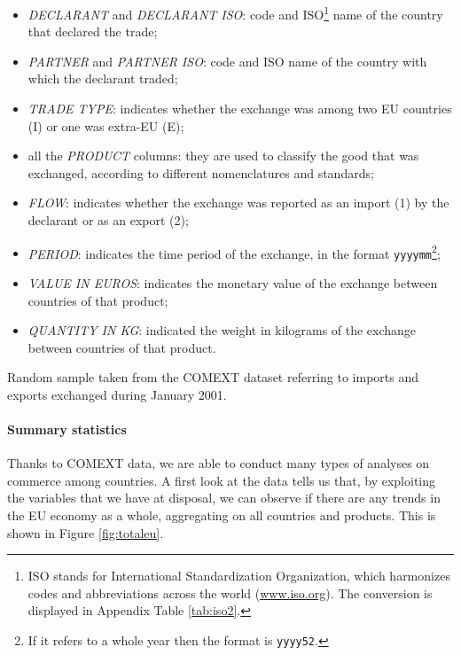 \begin{itemize}
    \item \textit{DECLARANT} and \textit{DECLARANT ISO}: code and ISO\footnote{ISO stands for International Standardization Organization, which harmonizes codes and abbreviations across the world (\url{www.iso.org}). The conversion is displayed in Appendix Table \ref{tab:iso2}.} name of the country that declared the trade;
    \item \textit{PARTNER} and \textit{PARTNER ISO}: code and ISO name of the country with which the declarant traded;
    \item \textit{TRADE TYPE}: indicates whether the exchange was among two EU countries (I) or one was extra-EU (E);
    \item all the \textit{PRODUCT} columns: they are used to classify the good that was exchanged, according to different nomenclatures and standards;
    \item \textit{FLOW}: indicates whether the exchange was reported as an import (1) by the declarant or as an export (2);
    \item \textit{PERIOD}: indicates the time period of the exchange, in the format \texttt{yyyymm}\footnote{If it refers to a whole year then the format is \texttt{yyyy52}.};
    \item \textit{VALUE IN EUROS}: indicates the monetary value of the exchange between countries of that product;
    \item \textit{QUANTITY IN KG}: indicated the weight in kilograms of the exchange between countries of that product.
\end{itemize}
\begin{landscape}
\begin{table}
    \centering
    
    \caption{Random sample taken from the COMEXT dataset referring to imports and exports exchanged during January 2001.}
    \label{tab:comextexample}
\end{table}
\end{landscape}

\paragraph{Summary statistics}
Thanks to COMEXT data, we are able to conduct many types of analyses on commerce among countries. A first look at the data tells us that, by exploiting the variables that we have at disposal, we can observe if there are any trends in the EU economy as a whole, aggregating on all countries and products. This is shown in Figure \ref{fig:totaleu}. 


